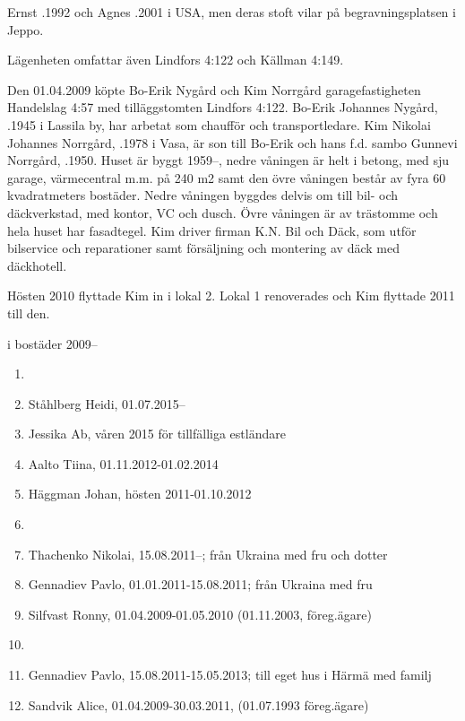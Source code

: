 Ernst .1992 och Agnes .2001 i USA, men deras stoft vilar på begravningsplatsen i Jeppo.




Lägenheten omfattar även Lindfors 4:122 och Källman 4:149.



Den 01.04.2009 köpte Bo-Erik Nygård och Kim Norrgård garagefastigheten Handelslag 4:57 med tilläggstomten Lindfors 4:122. Bo-Erik Johannes Nygård, .1945 i Lassila by, har arbetat som chaufför och transportledare. Kim Nikolai Johannes Norrgård, .1978 i Vasa, är son till Bo-Erik och hans f.d. sambo Gunnevi Norrgård, .1950. Huset är byggt 1959--, nedre våningen är helt i betong, med sju garage, värmecentral m.m. på 240 m2 samt den övre våningen består av fyra 60 kvadratmeters bostäder. Nedre våningen byggdes delvis om till bil- och däckverkstad, med kontor, VC och dusch. Övre våningen är av trästomme och hela huset har fasadtegel. Kim driver firman K.N. Bil och Däck, som utför bilservice och 	reparationer samt försäljning och montering av däck med däckhotell.

Hösten 2010 flyttade Kim in i lokal 2. Lokal 1 renoverades och Kim flyttade 2011 till den.

 i bostäder 2009--
\begin{enumerate}
  \item {}
  \item Ståhlberg Heidi,	01.07.2015--
  \item Jessika Ab, våren 2015 för tillfälliga estländare
  \item Aalto Tiina, 01.11.2012-01.02.2014
  \item Häggman Johan,	hösten 2011-01.10.2012
  \item {}
  \item Thachenko Nikolai, 15.08.2011--; från Ukraina	med fru och dotter
  \item Gennadiev Pavlo,	01.01.2011-15.08.2011; från Ukraina	med fru
  \item Silfvast Ronny,	01.04.2009-01.05.2010 (01.11.2003, föreg.ägare)
  \item {}
  \item Gennadiev Pavlo, 15.08.2011-15.05.2013; till eget hus i Härmä med familj
  \item Sandvik Alice,	01.04.2009-30.03.2011, (01.07.1993 föreg.ägare)
\end{enumerate}

